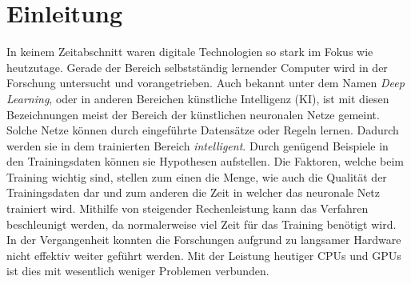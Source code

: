 \chapter{Einleitung}\label{s.einleitung} 
In keinem Zeitabschnitt waren digitale Technologien so stark im Fokus wie heutzutage. Gerade der Bereich selbstständig lernender Computer wird in der Forschung untersucht und vorangetrieben. Auch bekannt unter dem Namen \textit{Deep Learning}, oder  in anderen Bereichen künstliche Intelligenz (KI), ist mit diesen Bezeichnungen meist der Bereich der künstlichen neuronalen Netze gemeint. Solche Netze können durch eingeführte Datensätze oder Regeln lernen. Dadurch werden sie in dem trainierten Bereich \textit{intelligent}. Durch genügend Beispiele in den Trainingsdaten können sie Hypothesen aufstellen. Die Faktoren, welche beim Training wichtig sind, stellen zum einen die Menge, wie auch die Qualität der Trainingsdaten dar und zum anderen die Zeit in welcher das neuronale Netz trainiert wird. Mithilfe von steigender Rechenleistung kann das Verfahren beschleunigt werden, da normalerweise viel Zeit für das Training benötigt wird. In der Vergangenheit konnten die Forschungen aufgrund zu langsamer Hardware nicht effektiv weiter geführt werden. Mit der Leistung heutiger CPUs und GPUs ist dies mit wesentlich weniger Problemen verbunden.
